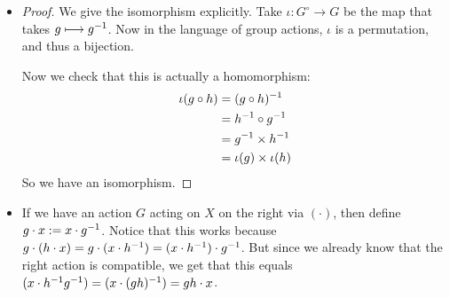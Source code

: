 \documentclass[12pt, twosided]{article}
\begin{document}
\begin{enumerate}
\begin{itemize}
\begin{proof}
      \begin{itemize}
      \item [(\(\Leftarrow\))] Suppose that \(G\) is commutative. Then
        \begin{align*}
          \mathrm{id}(g \circ h) &= g \circ h \\
                                 &= h \times g \\
                                 &= \mathrm{id}(h) \times \mathrm{id}(g) \\
                                 &= \mathrm{id}(g) \times \mathrm{id}(h).
        \end{align*}
        so \(\mathrm{id}\) is a homomorphism, and thus an isomorphism. \partdone
      \item [\((\Rightarrow)\)] Suppose now that \(\mathrm{id}\) is an isomorphism. Then in particular
        \begin{align*}
          \mathrm{id}(g \circ h) &= g \times h \\
                                 &= h \circ g \\
                                 &= \mathrm{id}(h \circ g) \\
                                 &= h \times g
        \end{align*}
        so we have commutativity. 
      \end{itemize}
    \end{proof}
  \item
    \begin{proof}
      We give the isomorphism explicitly. Take \(\iota: G^\circ \to G\) be the map that takes \(g \longmapsto g^{-1}\). Now in the language of group actions, \(\iota\) is a permutation, and thus a bijection. \partdone
      
      Now we check that this is actually a homomorphism:
      \begin{align*}
        \iota(g \circ h) &= (g \circ h)^{-1} \\
                         &= h^{-1} \circ g^{-1} \\
                         &= g^{-1} \times h^{-1} \\
                         &= \iota(g) \times \iota(h)
      \end{align*}
      So we have an isomorphism.
    \end{proof}
  \item If we have an action \(G\) acting on \(X\) on the right via \((\cdot)\), then define \(g \cdot x := x \cdot g^{-1}\). Notice that this works because \(g \cdot (h \cdot x) = g \cdot (x \cdot h^{-1}) = (x \cdot h^{-1}) \cdot g^{-1}\). But since we already know that the right action is compatible, we get that this equals \((x \cdot h^{-1}g^{-1}) = (x\cdot (gh)^{-1}) = gh \cdot x\).
  \end{itemize}
\end{enumerate}
\end{document}
